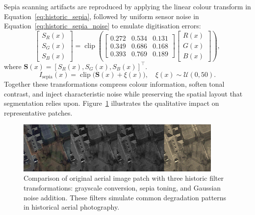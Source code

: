Sepia scanning artifacts are reproduced by applying the linear colour transform in Equation~\ref{eq:historic_sepia}, followed by uniform sensor noise in Equation~\ref{eq:historic_sepia_noise} to emulate digitisation errors:
\begin{equation}
\begin{bmatrix}
S_R(x) \\
S_G(x) \\
S_B(x)
\end{bmatrix}
= \operatorname{clip}\left(
\begin{bmatrix}
0.272 & 0.534 & 0.131 \\
0.349 & 0.686 & 0.168 \\
0.393 & 0.769 & 0.189
\end{bmatrix}
\begin{bmatrix}
R(x) \\
G(x) \\
B(x)
\end{bmatrix}
\right),
\label{eq:historic_sepia}
\end{equation}
where $\mathbf{S}(x) = [S_R(x), S_G(x), S_B(x)]^\top$.
\begin{equation}
I_{\text{sepia}}(x) = \operatorname{clip}\big(\mathbf{S}(x) + \xi(x)\big), \quad \xi(x) \sim \mathcal{U}(0, 50).
\label{eq:historic_sepia_noise}
\end{equation}
Together these transformations compress colour information, soften tonal contrast, and inject characteristic noise while preserving the spatial layout that segmentation relies upon. Figure~\ref{fig:historic_filters} illustrates the qualitative impact on representative patches.

\begin{figure}[H]
\centering
\includegraphics[width=0.9\textwidth]{Images/filters.png}
\caption{Comparison of original aerial image patch with three historic filter transformations: grayscale conversion, sepia toning, and Gaussian noise addition. These filters simulate common degradation patterns in historical aerial photography.}
\label{fig:historic_filters}
\end{figure}


